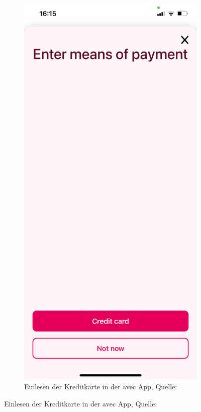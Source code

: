 \begin{figure}[h]
\begin{subfigure}[b]{0.4\textwidth}
		\label{img: Einlesen der Identitaetskarte}
	\end{subfigure}
	\hfill
	 \begin{subfigure}[b]{0.4\textwidth}
		\includegraphics[scale=0.15]{images/creditCard.PNG}
		\caption[Einlesen der Kreditkarte in der avec App]{Einlesen der Kreditkarte in der avec App, Quelle: \cite{avecApp}}
		\label{img: Einlesen der Kreditkarte in der avec App}
	\end{subfigure}
\end{figure}

